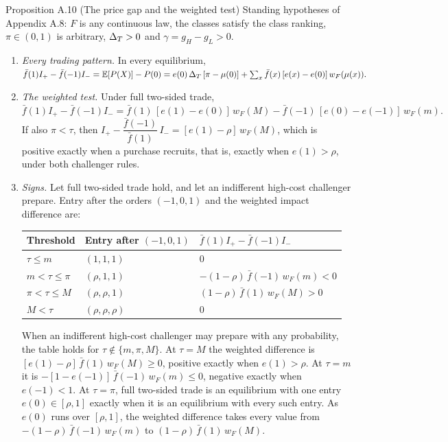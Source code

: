 {\small
\begin{paperresult}{Proposition A.10 (The price gap and the weighted test)}
Standing hypotheses of Appendix A.8: \(F\) is any continuous law, the classes satisfy the class ranking, \(\pi\in(0,1)\) is arbitrary, \(\Delta_T>0\) and \(\gamma=g_H-g_L>0\).
\begin{enumerate}[label=(\roman*),leftmargin=2em,nosep]
\item \emph{Every trading pattern.} In every equilibrium,
\(
\bar f(1)I_+-\bar f(-1)I_-=\mathbb{E}[P(X)]-P(0)=e(0)\,\Delta_T\,[\pi-\mu(0)]+\sum_x\bar f(x)\,[e(x)-e(0)]\,w_F(\mu(x)).
\)
\item \emph{The weighted test.} Under full two-sided trade,
\(
\bar f(1)I_+-\bar f(-1)I_-=\bar f(1)\,[e(1)-e(0)]\,w_F(M)-\bar f(-1)\,[e(0)-e(-1)]\,w_F(m).
\)
If also \(\pi<\tau\), then \(I_+-\dfrac{\bar f(-1)}{\bar f(1)}\,I_-=[e(1)-\rho]\,w_F(M)\), which is positive exactly when a purchase recruits, that is, exactly when \(e(1)>\rho\), under both challenger rules.
\item \emph{Signs.} Let full two-sided trade hold, and let an indifferent high-cost challenger prepare. Entry after the orders \((-1,0,1)\) and the weighted impact difference are:
\begin{center}\normalfont\small
\begin{tabular}{@{}lll@{}}
\toprule
Threshold & Entry after \((-1,0,1)\) & \(\bar f(1)I_+-\bar f(-1)I_-\)\\
\midrule
\(\tau\le m\) & \((1,1,1)\) & \(0\)\\
\(m<\tau\le\pi\) & \((\rho,1,1)\) & \(-(1-\rho)\,\bar f(-1)\,w_F(m)<0\)\\
\(\pi<\tau\le M\) & \((\rho,\rho,1)\) & \((1-\rho)\,\bar f(1)\,w_F(M)>0\)\\
\(M<\tau\) & \((\rho,\rho,\rho)\) & \(0\)\\
\bottomrule
\end{tabular}
\end{center}
When an indifferent high-cost challenger may prepare with any probability, the table holds for \(\tau\notin\{m,\pi,M\}\). At \(\tau=M\) the weighted difference is \([e(1)-\rho]\,\bar f(1)\,w_F(M)\ge0\), positive exactly when \(e(1)>\rho\). At \(\tau=m\) it is \(-[1-e(-1)]\,\bar f(-1)\,w_F(m)\le0\), negative exactly when \(e(-1)<1\). At \(\tau=\pi\), full two-sided trade is an equilibrium with one entry \(e(0)\in[\rho,1]\) exactly when it is an equilibrium with every such entry. As \(e(0)\) runs over \([\rho,1]\), the weighted difference takes every value from \(-(1-\rho)\,\bar f(-1)\,w_F(m)\) to \((1-\rho)\,\bar f(1)\,w_F(M)\).

\end{enumerate}
\end{paperresult}}
